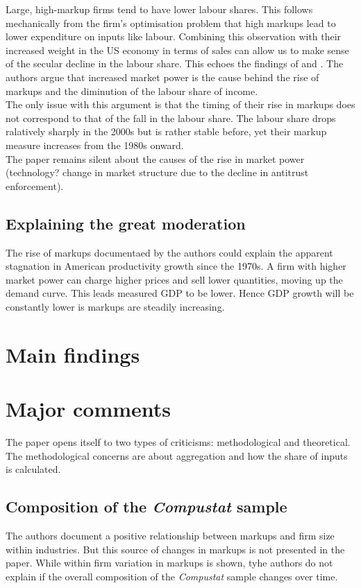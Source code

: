 \documentclass{amsart}
\theoremstyle{definition}
\theoremstyle{remark}
\numberwithin{equation}{section}
\begin{document}
Large, high-markup firms tend to have lower labour shares. This follows mechanically from the firm's optimisation problem that high markups lead to lower expenditure on inputs like labour. Combining this observation with their increased weight in the US economy in terms of sales can allow us to make sense of the secular decline in the labour share. This echoes the findings of \cite{autor2019fall} and \cite{kehrig2017growing}. The authors argue that increased market power is the cause behind the rise of markups and the diminution of the labour share of income.\\

The only issue with this argument is that the timing of their rise in markups does not correspond to that of the fall in the labour share. The labour share drops ralatively sharply in the 2000s but is rather stable before, yet their markup measure increases from the 1980s onward.\\

The paper remains silent about the causes of the rise in market power (technology? change in market structure due to the decline in antitrust enforcement).

\subsection*{Explaining the great moderation} The rise of markups documentaed by the authors could explain the apparent stagnation in American productivity growth since the 1970s. A firm with higher market power can charge higher prices and sell lower quantities, moving up the demand curve. This leads measured GDP to be lower. Hence GDP growth will be constantly lower is markups are steadily increasing.\\

\section{Main findings}



\section{Major comments}

The paper opens itself to two types of criticisms: methodological and theoretical. The methodological concerns are about aggregation and how the share of inputs is calculated.

\subsection*{Composition of the \textit{Compustat} sample} The authors document a positive relationship between markups and firm size within industries. But this source of changes in markups is not presented in the paper. While within firm variation in markups is shown, tyhe authors do not explain if the overall composition of the \textit{Compustat} sample changes over time.\\
\end{document}
